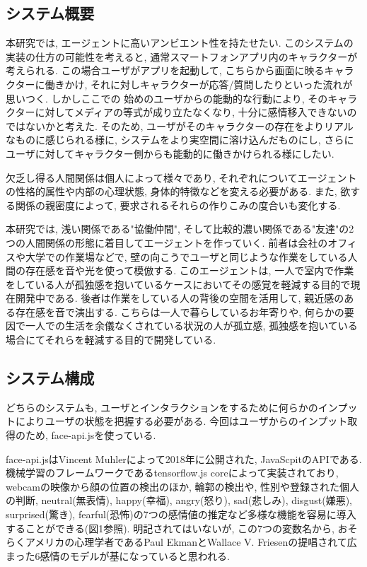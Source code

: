 \documentclass[a4paper,dvipdfmx]{hisken}
\begin{document}
\subsection{システム概要}
本研究では, エージェントに高いアンビエント性を持たせたい. このシステムの実装の仕方の可能性を考えると, 通常スマートフォンアプリ内のキャラクターが考えられる. この場合ユーザがアプリを起動して, こちらから画面に映るキャラクターに働きかけ, それに対しキャラクターが応答/質問したりといった流れが思いつく. しかしここでの 始めのユーザからの能動的な行動により, そのキャラクターに対してメディアの等式が成り立たなくなり, 十分に感情移入できないのではないかと考えた. そのため, ユーザがそのキャラクターの存在をよりリアルなものに感じられる様に, システムをより実空間に溶け込んだものにし, さらにユーザに対してキャラクター側からも能動的に働きかけられる様にしたい.

欠乏し得る人間関係は個人によって様々であり, それぞれについてエージェントの性格的属性や内部の心理状態, 身体的特徴などを変える必要がある. また, 欲する関係の親密度によって, 要求されるそれらの作りこみの度合いも変化する. 

本研究では, 浅い関係である"協働仲間", そして比較的濃い関係である"友達"の2つの人間関係の形態に着目してエージェントを作っていく. 前者は会社のオフィスや大学での作業場などで, 壁の向こうでユーザと同じような作業をしている人間の存在感を音や光を使って模倣する. このエージェントは, 一人で室内で作業をしている人が孤独感を抱いているケースにおいてその感覚を軽減する目的で現在開発中である. 後者は作業をしている人の背後の空間を活用して, 親近感のある存在感を音で演出する. こちらは一人で暮らしているお年寄りや, 何らかの要因で一人での生活を余儀なくされている状況の人が孤立感, 孤独感を抱いている場合にてそれらを軽減する目的で開発している.

\subsection{システム構成}
どちらのシステムも, ユーザとインタラクションをするために何らかのインプットによりユーザの状態を把握する必要がある. 今回はユーザからのインプット取得のため, face-api.jsを使っている. 

face-api.jsはVincent Muhlerによって2018年に公開された, JavaScpitのAPIである. 機械学習のフレームワークであるtensorflow.js coreによって実装されており, webcamの映像から顔の位置の検出のほか, 輪郭の検出や, 性別や登録された個人の判断, neutral(無表情), happy(幸福), angry(怒り), sad(悲しみ), disgust(嫌悪), surprised(驚き), fearful(恐怖)の7つの感情値の推定など多様な機能を容易に導入することができる(図1参照). 明記されてはいないが, この7つの変数名から, おそらくアメリカの心理学者であるPaul EkmanとWallace V. Friesenの提唱されて広まった6感情のモデルが基になっていると思われる.
\end{document}

